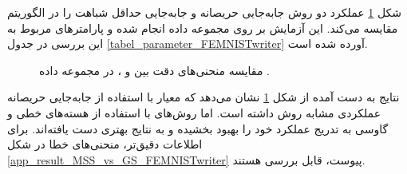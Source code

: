 شکل
\ref{result_MSS_vs_GS_FEMNISTwriter}
عملکرد دو روش جابه‌جایی حریصانه و جابه‌جایی حداقل شباهت را در الگوریتم
مقایسه می‌کند. این آزمایش بر روی مجموعه داده
انجام شده و پارامترهای مربوط به این بررسی در جدول
\ref{tabel_parameter_FEMNISTwriter}
آورده شده است.


\begin{figure}[h]
	\centering
	\hspace{0.8mm}
	\caption{
		مقایسه منحنی‌های دقت بین
		و
		، در مجموعه داده
		.
	}
	\label{result_MSS_vs_GS_FEMNISTwriter}
\end{figure}



نتایج به دست آمده از شکل
\ref{result_MSS_vs_GS_FEMNISTwriter}
نشان می‌دهد که معیار
با استفاده از جابه‌جایی حریصانه عملکردی مشابه روش
داشته است. اما روش‌های
با استفاده از هسته‌های خطی و گاوسی به تدریج عملکرد خود را بهبود بخشیده و به نتایج بهتری دست یافته‌اند. برای اطلاعات دقیق‌تر، منحنی‌های خطا در شکل
\ref{app_result_MSS_vs_GS_FEMNISTwriter}
پیوست، قابل بررسی هستند.



